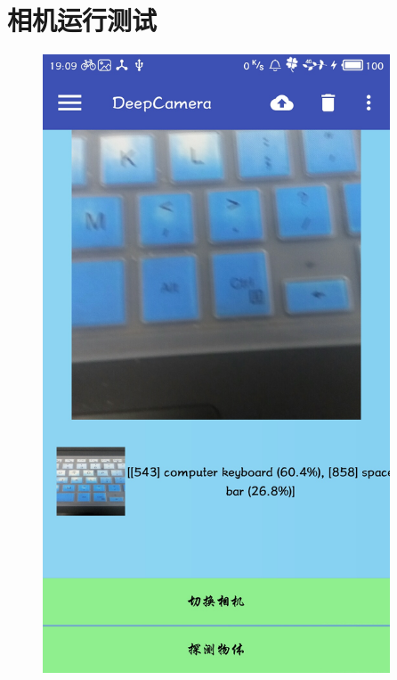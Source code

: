 \documentclass[UTF8, Microsoft YaHei]{book}
\begin{document}
    \section{相机运行测试}
    \begin{figure}[!htb]
    \centering
    \begin{minipage}[c]{0.5\textwidth}
    \centering
    \includegraphics[width=0.92\textwidth]{img/test1.png}
    \end{minipage}%
    \begin{minipage}[c]{0.5\textwidth}
    \centering

\end{minipage}
\end{figure}
\end{document}
